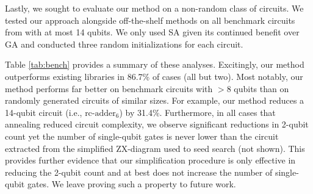 Lastly, we sought to evaluate our method on a non-random class of circuits.
We tested our approach alongside off-the-shelf methods on all benchmark circuits from \cite{kissinger2019reducing} with at most 14 qubits.
We only used SA given its continued benefit over GA and conducted three random initializations for each circuit.

Table \ref{tab:bench} provides a summary of these analyses.
Excitingly, our method outperforms existing libraries in 86.7\% of cases (all but two).
Most notably, our method performs far better on benchmark circuits with $>8$ qubits than on randomly generated circuits of similar sizes.
For example, our method reduces a 14-qubit circuit (i.e., $\text{rc-adder}_6$) by 31.4\%.
Furthermore, in all cases that annealing reduced circuit complexity, we observe significant reductions in 2-qubit count yet the number of single-qubit gates is never lower than the circuit extracted from the simplified ZX-diagram used to seed search (not shown).
This provides further evidence that our simplification procedure is only effective in reducing the 2-qubit count and at best does not increase the number of single-qubit gates.
We leave proving such a property to future work.



